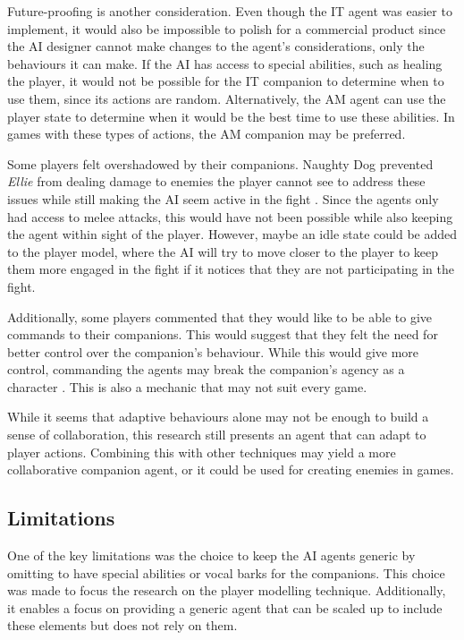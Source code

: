 \documentclass{IEEEtran}
\begin{document}
Future-proofing is another consideration. Even though the IT agent was easier to implement, it would also be impossible to polish for a commercial product since the AI designer cannot make changes to the agent’s considerations, only the behaviours it can make. If the AI has access to special abilities, such as healing the player, it would not be possible for the IT companion to determine when to use them, since its actions are random. Alternatively, the AM agent can use the player state to determine when it would be the best time to use these abilities. In games with these types of actions, the AM companion may be preferred.

Some players felt overshadowed by their companions. Naughty Dog prevented \textit{Ellie} from dealing damage to enemies the player cannot see to address these issues while still making the AI seem active in the fight \cite{GAIP2EllieAI}. Since the agents only had access to melee attacks, this would have not been possible while also keeping the agent within sight of the player. However, maybe an idle state could be added to the player model, where the AI will try to move closer to the player to keep them more engaged in the fight if it notices that they are not participating in the fight.

Additionally, some players commented that they would like to be able to give commands to their companions. This would suggest that they felt the need for better control over the companion's behaviour. While this would give more control, commanding the agents may break the companion's agency as a character \cite{EGXCharacterDeathGuildWars}. This is also a mechanic that may not suit every game.

While it seems that adaptive behaviours alone may not be enough to build a sense of collaboration, this research still presents an agent that can adapt to player actions. Combining this with other techniques may yield a more collaborative companion agent, or it could be used for creating enemies in games.

\subsection{Limitations}
\label{Limitations}

One of the key limitations was the choice to keep the AI agents generic by omitting to have special abilities or vocal barks for the companions. This choice was made to focus the research on the player modelling technique. Additionally, it enables a focus on providing a generic agent that can be scaled up to include these elements but does not rely on them.
\end{document}
